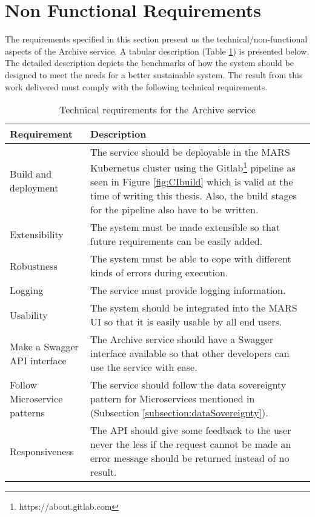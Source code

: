 \section{Non Functional Requirements}
\label{section:technicalReq}
The requirements specified in this section present us the technical/non-functional aspects of the Archive service. A tabular description 
(Table \ref{table: Technical Requirements}) is presented below.
The detailed description depicts the benchmarks of how the system should be designed to meet the needs for a better sustainable system.
The result from this work delivered must comply with the following technical requirements.
\begin{table}[h!]
    \centering
    \begin{tabular}{|p{3cm}|p{12cm}|}
            \hline
                \textbf{Requirement}  & \textbf{Description}\\
            \hline
                 Build and deployment & 
                 The service should be deployable in the MARS Kubernetus \cite{kubernetes} cluster using the Gitlab\footnote{https://about.gitlab.com} pipeline as seen in Figure \ref{fig:CIbuild}
                 which is valid at the time of writing this thesis. Also,
                 the build stages for the pipeline also have to be written. \\
            \hline
                 Extensibility & The system must be made extensible so that future requirements can be easily added.\\
            \hline
                 Robustness & The system must be able to cope with different kinds of errors during execution.\\    
            \hline
                 Logging &  The service must provide logging information.\\    
            \hline
                 Usability & The system should be integrated into the MARS UI so that it is easily usable by all end users.\\     
            \hline
                 Make a Swagger API interface & The Archive service should have a Swagger \cite{swagger} interface available so that other 
                 developers can use the service with ease.\\         
            \hline
                Follow Microservice patterns & The service should follow the data sovereignty pattern for Microservices mentioned in 
                (Subsection \ref{subsection:dataSovereignty}).\\ 
            \hline
                Responsiveness & The API should give some feedback to the user never the less if the request cannot be made an 
                error message should be returned instead of no result.\\      
            \hline
           
    \end{tabular} 
    \caption{Technical requirements for the Archive service}
    \label{table: Technical Requirements}  
    \end{table} 
  
    